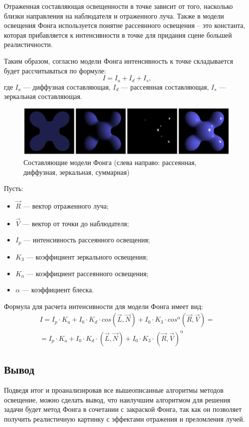 Отраженная составляющая освещенности в точке зависит от того, насколько близки направления на наблюдателя и отраженного луча.
Также в модели освещения Фонга используется понятие рассеянного освещения – это константа, которая прибавляется к интенсивности в точке для придания сцене большей реалистичности. 
 
Таким образом, согласно модели Фонга интенсивность к точке складывается будет рассчитываться по формуле: 
\begin{equation}
	\label{eq:simple-model}
	I = I_a + I_d + I_s,
\end{equation}
где $I_a$ --- диффузная составляющая, $I_d$ --- рассеянная  составляющая, $I_s$ --- зеркальная составляющая.
 
\begin{figure}[h]
	\centering
	\includegraphics[height=0.15\textheight]{img/phong-model.png}
	\caption{Составляющие модели Фонга (слева направо: рассеянная, диффузная, зеркальная, суммарная)}
	\label{img:fong-model}
\end{figure}

Пусть:
\begin{itemize}
	\item $\overrightarrow R$ --- вектор отраженного луча;
	\item $\overrightarrow V$ --- вектор от точки до наблюдателя;
	\item $I_p$ --- интенсивность рассеянного освещения;
	\item $K_3$ --- коэффициент зеркального освещения;
	\item $K_a$ --- коэффициент рассеянного освещения;
	\item $\alpha$ --- коэффициент блеска.
\end{itemize}
 
Формула для расчета интенсивности для модели Фонга имеет вид:
\begin{equation}
	\label{eq:lambert}
	\begin{aligned}
		I = I_p \cdot K_a  + I_0 \cdot K_d \cdot cos(\overrightarrow L, \overrightarrow N) + I_0 \cdot K_3 \cdot cos^{\alpha}(\overrightarrow R, \overrightarrow V) = \\ = I_p \cdot K_a  + I_0 \cdot K_d \cdot (\overrightarrow L, \overrightarrow N) + I_0 \cdot K_3 \cdot (\overrightarrow R, \overrightarrow V)^{\alpha} 
	\end{aligned}
\end{equation}
 
\subsection*{Вывод}
Подведя итог и проанализировав все вышеописанные алгоритмы методов освещение, можно сделать вывод, что наилучшим алгоритмом для решения задачи будет метод Фонга в сочетании с закраской Фонга, так как он позволяет получить реалистичную картинку с эффектами отражения и преломления лучей. 